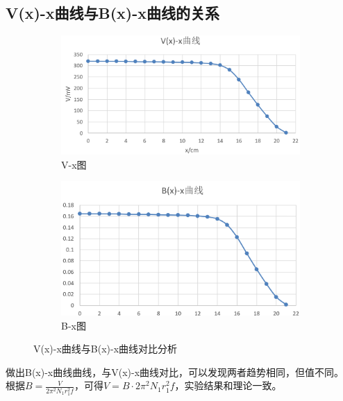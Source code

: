 \documentclass[12pt,a4paper]{article}
\begin{document}
	\subsection{V(x)-x曲线与B(x)-x曲线的关系}
	\begin{figure}[H]
		\centering
		\begin{subfigure}[b]{0.4\textwidth}
			\centering
			\includegraphics[width=\textwidth]{V-x.png}
			\caption{V-x图}
			\label{fig:chart-amplitude}
		\end{subfigure}
		\hfill
		\begin{subfigure}[b]{0.4\textwidth}
			\centering
			\includegraphics[width=\textwidth]{B-x.png}
			\caption{B-x图}
			\label{fig:chart-frequency}
		\end{subfigure}
		\caption{V(x)-x曲线与B(x)-x曲线对比分析}
		\label{fig:chart1}
	\end{figure}
	做出B(x)-x曲线曲线，与V(x)-x曲线对比，可以发现两者趋势相同，但值不同。\\
	根据$B = \frac{V}{2\pi^2N_1r_1^2f}$，可得$V = B \cdot 2 \pi^2 N_1 r_1^2 f$，实验结果和理论一致。
\end{document}
